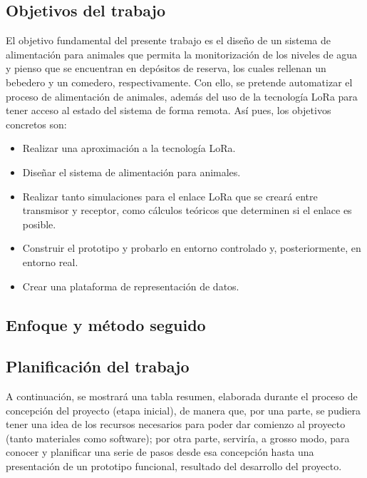 \documentclass[12pt]{article}
\begin{document}
	\subsection[Objetivos del trabajo]{Objetivos del trabajo}
	
	El objetivo fundamental del presente trabajo es el diseño de un sistema de alimentación para animales que permita la monitorización de los niveles de agua y pienso que se encuentran en depósitos de reserva, los cuales rellenan un bebedero y un comedero, respectivamente.  Con ello, se pretende automatizar el proceso de alimentación de animales, además del uso de la tecnología LoRa para tener acceso al estado del sistema de forma remota. Así pues, los objetivos concretos son:
	
	\begin{itemize}
		\item Realizar una aproximación a la tecnología LoRa.
		\item Diseñar el sistema de alimentación para animales.
		\item Realizar tanto simulaciones para el enlace LoRa que se creará entre transmisor y receptor, como cálculos teóricos que determinen si el enlace es posible.
		\item Construir el prototipo y probarlo en entorno controlado y, posteriormente, en entorno real.
		\item Crear una plataforma de representación de datos.
	\end{itemize}
	
	\subsection[Enfoque y método seguido]{Enfoque y método seguido}
	\subsection[Planificación del trabajo]{Planificación del trabajo}
	
	\noindent A continuación, se mostrará una tabla resumen, elaborada durante el proceso de concepción del proyecto (etapa inicial), de manera que, por una parte, se pudiera tener una idea de los recursos necesarios para poder dar comienzo al proyecto (tanto materiales como software); por otra parte, serviría, a grosso modo, para conocer y planificar una serie de pasos desde esa concepción hasta una presentación de un prototipo funcional, resultado del desarrollo del proyecto. \\
	
\end{document}
